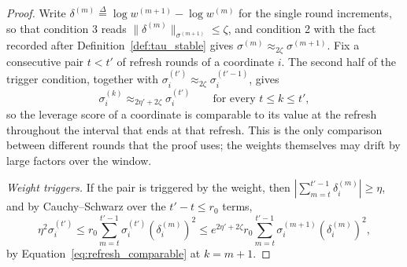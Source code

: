 \documentclass[11pt]{article}
\newcommand{\defeq}{\stackrel{\Delta}{=}}
\begin{document}
\begin{proof}
Write $\delta^{(m)} \defeq \log w^{(m + 1)} - \log w^{(m)}$ for the single round
increments, so that condition 3 reads
$\|\delta^{(m)}\|_{\sigma^{(m + 1)}} \le \zeta$, and condition 2 with the fact
recorded after Definition~\ref{def:tau_stable} gives
$\sigma^{(m)} \approx_{2 \zeta} \sigma^{(m + 1)}$.
Fix a consecutive pair $t < t'$ of refresh rounds of a coordinate
$i$.
The second half of the trigger condition, together with
$\sigma^{(t')}_i \approx_{2 \zeta} \sigma^{(t' - 1)}_i$, gives
\begin{equation}
\label{eq:refresh_comparable}
\sigma^{(k)}_i \approx_{2 \eta' + 2 \zeta} \sigma^{(t')}_i
\qquad\text{for every } t \le k \le t' ,
\end{equation}
so the leverage score of a coordinate is comparable to its value at the refresh
throughout the interval that ends at that refresh.
This is the only comparison between different rounds that the proof uses; the
weights themselves may drift by large factors over the window.

\emph{Weight triggers.}
If the pair is triggered by the weight, then
$|\sum_{m = t}^{t' - 1} \delta^{(m)}_i| \ge \eta$, and by Cauchy--Schwarz over
the $t' - t \le r_0$ terms,
\[
\eta^{2} \sigma^{(t')}_i
\le
r_0 \sum_{m = t}^{t' - 1} \sigma^{(t')}_i \left( \delta^{(m)}_i \right)^2
\le
e^{2 \eta' + 2 \zeta} r_0
\sum_{m = t}^{t' - 1} \sigma^{(m + 1)}_i \left( \delta^{(m)}_i \right)^2 ,
\]
by Equation~\eqref{eq:refresh_comparable} at $k = m + 1$.


\end{proof}
\end{document}
